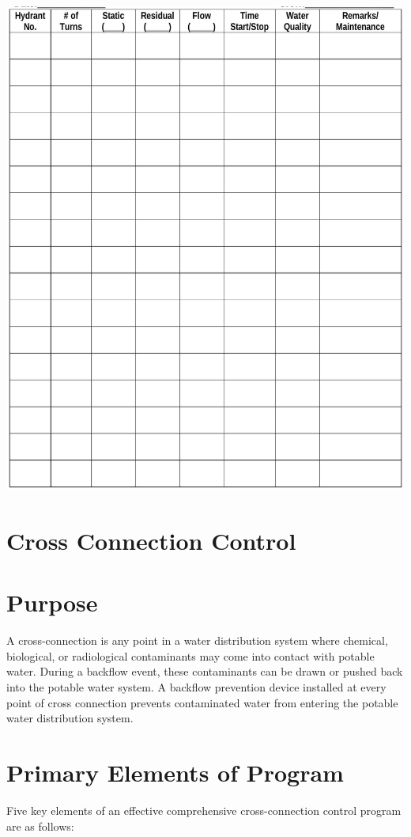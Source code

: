 \documentclass[10pt]{article}
\begin{document}
\includegraphics[max width=\textwidth]{2022_10_30_098bb5f44c5986ff92a9g-77}

\section{Cross Connection Control}
\section{Purpose}
A cross-connection is any point in a water distribution system where chemical, biological, or radiological contaminants may come into contact with potable water. During a backflow event, these contaminants can be drawn or pushed back into the potable water system. A backflow prevention device installed at every point of cross connection prevents contaminated water from entering the potable water distribution system.

\section{Primary Elements of Program}
Five key elements of an effective comprehensive cross-connection control program are as follows:
\end{document}

